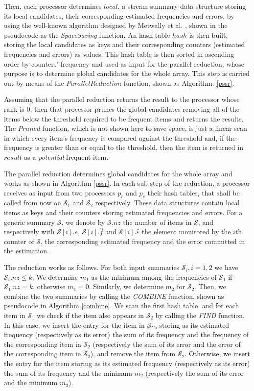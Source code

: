 \documentclass[final,3p,times]{elsarticle}
\begin{document}
Then, each processor determines $local$, a stream summary data structure storing its local candidates, their corresponding estimated frequencies and errors, by using the well-known  algorithm designed by Metwally et al. \cite{Metwally2006}, shown in the pseudocode as the \textit{SpaceSaving} function. An hash table $hash$ is then built, storing the local candidates as keys and their corresponding counters (estimated frequencies and errors) as values. This hash table is then sorted in ascending order by counters' frequency and used as input for the parallel reduction, whose purpose is to determine global candidates for the whole array.
This step is carried out by means of the $ParallelReduction$ function, shown as Algorithm. \ref{pssr}.

Assuming that the parallel reduction returns the result to the processor whose rank is 0, then that processor prunes the global candidates removing all of the items below the threshold required to be frequent items and returns the results. The $Pruned$ function, which is not shown here to save space, is just a linear scan in which every item's frequency is compared against the threshold and, if the frequency is greater than or equal to the threshold, then the item is returned in $result$ as a \emph{potential} frequent item.

The parallel reduction determines global candidates for the whole array and works as shown in Algorithm \ref{pssr}. In each sub-step of the reduction, a processor receives as input from two processors  $p_{r}$ and $p_{s}$ their  hash tables, that shall be called from now on  $\mathcal{S}_1$ and $\mathcal{S}_2$ respectively. These data structures contain local items as keys and their counters storing estimated frequencies and errors. For a generic summary $\mathcal{S}$, we denote by $\mathcal{S}.nz$ the number of  items in $\mathcal{S}$, and respectively with $\mathcal{S}[i].e$,  $\mathcal{S}[i].\hat{f}$ and $\mathcal{S}[i].\hat{\varepsilon}$ the element monitored by the $i$th counter of $\mathcal{S}$, the corresponding estimated frequency and the error committed in the estimation. 

The reduction works as follows. For both input summaries $\mathcal{S}_i, i = 1,2$ we have $\mathcal{S}_i.nz \leq k$.  We determine $m_1$ as the minimum among the frequencies of $\mathcal{S}_1$ if $\mathcal{S}_1.nz = k$, otherwise $m_1 =  0$. Similarly, we determine $m_2$ for $\mathcal{S}_2$.
Then, we combine the two summaries by calling the \textit{COMBINE} function, shown as pseudocode in Algorithm \ref{combine}. We scan the first hash table, and for each item in $\mathcal{S}_1$ we check if the item also appears in $\mathcal{S}_2$ by calling the \textit{FIND} function. In this case, we insert the entry for the item in $\mathcal{S}_C$, storing as its estimated frequency (respectively as its error) the sum of its frequency and the frequency of the corresponding item in $\mathcal{S}_2$ (respectively the sum of its error and the error of the corresponding item in $\mathcal{S}_2$), and remove the item from $\mathcal{S}_2$. Otherwise, we insert the entry for the item storing as its estimated frequency (respectively as its error) the sum of its frequency and the minimum $m_2$ (respectively the sum of its error and the minimum $m_2$). 
\end{document}
